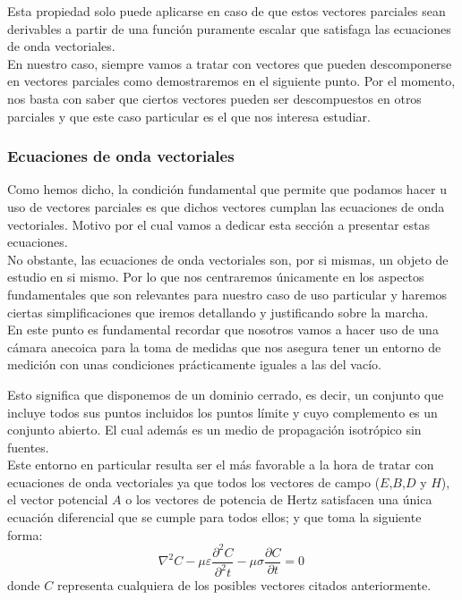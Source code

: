 \documentclass{article}
\begin{document}
Esta propiedad solo puede aplicarse en caso de que estos vectores parciales sean derivables a partir de una función puramente escalar que satisfaga las ecuaciones de onda vectoriales. \\
En nuestro caso, siempre vamos a tratar con vectores que pueden descomponerse en vectores parciales como demostraremos en el siguiente punto. Por el momento, nos basta con saber que ciertos vectores pueden ser descompuestos en otros parciales y que este caso particular es el que nos interesa estudiar.

\subsubsection{Ecuaciones de onda vectoriales}

Como hemos dicho, la condición fundamental que permite que podamos hacer u uso de vectores parciales es que dichos vectores cumplan las ecuaciones de onda vectoriales. Motivo por el cual vamos a dedicar esta sección a presentar estas ecuaciones.\\
No obstante, las ecuaciones de onda vectoriales son, por si mismas, un objeto de estudio en si mismo. Por lo que nos centraremos únicamente en los aspectos fundamentales que son relevantes para nuestro caso de uso particular y haremos ciertas simplificaciones que iremos detallando y justificando sobre la marcha.\\

En este punto es fundamental recordar que nosotros vamos a hacer uso de una cámara anecoica para la toma de medidas que nos asegura tener un entorno de medición con unas condiciones prácticamente iguales a las del vacío.\\

\newpage

Esto significa que disponemos de un dominio cerrado, es decir, un conjunto que incluye todos sus puntos incluidos los puntos límite y cuyo complemento es un conjunto abierto. El cual además es un medio de propagación isotrópico sin fuentes.\\

Este entorno en particular resulta ser el más favorable a la hora de tratar con ecuaciones de onda vectoriales ya que todos los vectores de campo ($E$,$B$,$D$ y $H$),  el vector potencial $A$ o  los vectores de potencia de Hertz satisfacen una única ecuación diferencial que se cumple para todos ellos; y que toma la siguiente forma:
\begin{equation}
\nabla^2C - \mu\varepsilon\frac{\partial^2C}{\partial^2{t}} - \mu\sigma\frac{\partial C}{\partial{t}} = 0\
\label{eq-esfvec-general}
\end{equation}
donde $C$ representa cualquiera de los posibles vectores citados anteriormente.
\\
\end{document}
